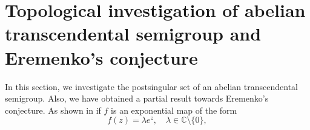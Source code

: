 \documentclass[a4paper,12pt]{amsart}
\numberwithin{equation}{section}
\newtheorem{theorem}{Theorem}[section]
\begin{document}
	\section{Topological investigation  of abelian transcendental  semigroup and Eremenko's conjecture}\label{sec5}
		In this section, we investigate the postsingular set of an abelian transcendental semigroup. Also, we have obtained a partial result towards Eremenko's conjecture.
	As shown in \cite{schleicher2003escaping} if $f$ is an exponential map of the form
	\[
	f(z) = \lambda e^{z}, \quad \lambda \in \mathbb{C} \setminus \{0\},
	\]
\end{document}
